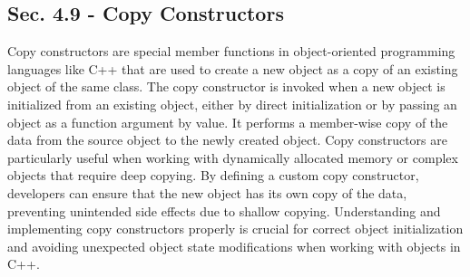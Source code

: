 \subsection*{Sec. 4.9 - Copy Constructors}

Copy constructors are special member functions in object-oriented programming languages like C++ that are used to create a new object as a copy of an existing object of the same class. The copy constructor is invoked when a new object is initialized from an 
existing object, either by direct initialization or by passing an object as a function argument by value. It performs a member-wise copy of the data from the source object to the newly created object. Copy constructors are particularly useful when working with 
dynamically allocated memory or complex objects that require deep copying. By defining a custom copy constructor, developers can ensure that the new object has its own copy of the data, preventing unintended side effects due to shallow copying. Understanding 
and implementing copy constructors properly is crucial for correct object initialization and avoiding unexpected object state modifications when working with objects in C++.

